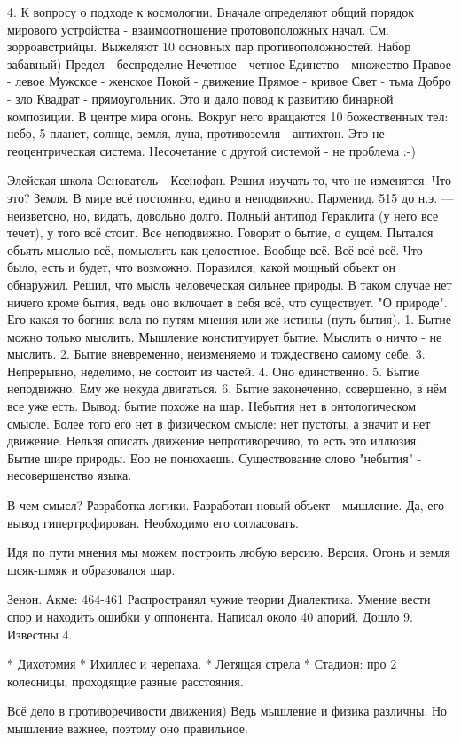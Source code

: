4. К вопросу о подходе к космологии. Вначале определяют общий порядок мирового устройства - взаимоотношение протовоположных начал. См. зорроавстрийцы. Выжеляют 10 основных пар противоположностей. Набор забавный)
Предел - беспределие
Нечетное - четное
Единство - множество
Правое - левое
Мужское - женское
Покой - движение
Прямое - кривое
Свет - тьма
Добро - зло
Квадрат - прямоугольник.
Это и дало повод к развитию бинарной композиции.
В центре мира огонь. Вокруг него вращаются 10 божественных тел: небо, 5 планет, солнце, земля, луна, противоземля - антихтон. Это не геоцентрическая система. Несочетание с другой системой - не проблема :-)

Элейская школа
Основатель - Ксенофан. Решил изучать то, что не изменятся. Что это? Земля. В мире всё постоянно, едино и неподвижно. 
Парменид. 515 до н.э. --- неизветсно, но, видать, довольно долго. Полный антипод Гераклита (у него все течет), у того всё стоит. Все неподвижно. Говорит о бытие, о сущем. 
Пытался объять мыслью всё, помыслить как целостное. Вообще всё. Всё-всё-всё. Что было, есть и будет, что возможно. Поразился, какой мощный объект он обнаружил. Решил, что мысль человеческая сильнее природы. 
В таком случае нет ничего кроме бытия, ведь оно включает в себя всё, что существует. "О природе". Его какая-то богиня вела по путям мнения или же истины (путь бытия). 
1. Бытие можно только мыслить. Мышление конституирует бытие. Мыслить о ничто - не мыслить. 
2. Бытие вневременно, неизменяемо и тождествено самому себе. 
3. Непрерывно, неделимо, не состоит из частей. 4. Оно единственно. 5. Бытие неподвижно. Ему же некуда двигаться.
6. Бытие законеченно, совершенно, в нём все уже есть.
Вывод: бытие похоже на шар.
Небытия нет в онтологическом смысле. Более того его нет в физическом смысле: нет пустоты, а значит и нет движение. Нельзя описать движение непротиворечиво, то есть это иллюзия. 
Бытие шире природы. Еоо не понюхаешь.
Существование слово "небытия" - несовершенство языка.

В чем смысл? Разработка логики. Разработан новый объект - мышление. Да, его вывод гипертрофирован. Необходимо его согласовать.

Идя по пути мнения мы можем построить любую версию.
Версия. Огонь и земля шсяк-шмяк и образовался шар.

Зенон. Акме: 464-461 
Распространял чужие теории
Диалектика. Умение вести спор и находить ошибки у оппонента. Написал около 40 апорий. Дошло 9. Известны 4.

	* Дихотомия
	* Ихиллес и черепаха.
	* Летящая стрела
	* Стадион: про 2 колесницы, проходящие разные расстояния.

Всё дело в противоречивости движения)  Ведь мышление и физика различны. Но мышление важнее, поэтому оно правильное.

